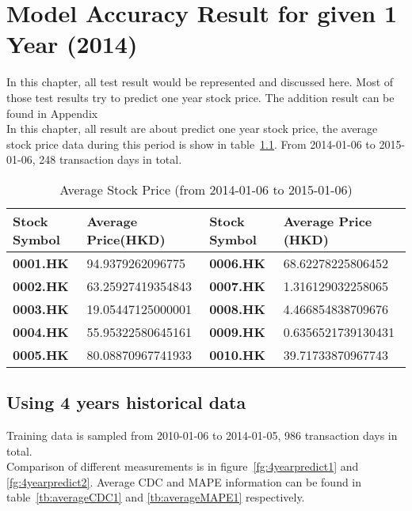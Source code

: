\chapter{Model Accuracy Result for given 1 Year (2014)}
\label{ch:AccuracyResult}
In this chapter, all test result would be represented and discussed here. Most of those test results try to predict one year stock price. The addition result can be found in Appendix~\\


In this chapter, all result are about predict one year stock price, the average stock price data during this period is show in table~\ref{tb:avg20142015}. From 2014-01-06 to 2015-01-06, 248 transaction days in total.

\begin{table}[h]
	\centering
	\begin{tabular}{|l|l|l|l|}
		\hline
		\textbf{Stock Symbol} & \textbf{Average Price(HKD)} & \textbf{Stock Symbol} & \textbf{Average Price (HKD)} \\ \hline
		\textbf{0001.HK}      & 94.9379262096775       & \textbf{0006.HK}      & 68.62278225806452      \\ \hline
		\textbf{0002.HK}      & 63.25927419354843      & \textbf{0007.HK}      & 1.316129032258065      \\ \hline
		\textbf{0003.HK}      & 19.05447125000001      & \textbf{0008.HK}      & 4.466854838709676      \\ \hline
		\textbf{0004.HK}      & 55.95322580645161      & \textbf{0009.HK}      & 0.6356521739130431     \\ \hline
		\textbf{0005.HK}      & 80.08870967741933      & \textbf{0010.HK}      & 39.71733870967743      \\ \hline
	\end{tabular}
	\caption{Average Stock Price (from 2014-01-06 to 2015-01-06)}
	\label{tb:avg20142015}
\end{table}

\section{Using 4 years historical data}
\label{sec:4predict}

Training data is sampled from 2010-01-06 to 2014-01-05, 986 transaction days in total.\\


Comparison of different measurements is in figure~\ref{fg:4yearpredict1} and \ref{fg:4yearpredict2}. Average CDC and MAPE information can be found in table~\ref{tb:averageCDC1} and \ref{tb:averageMAPE1} respectively.\\

